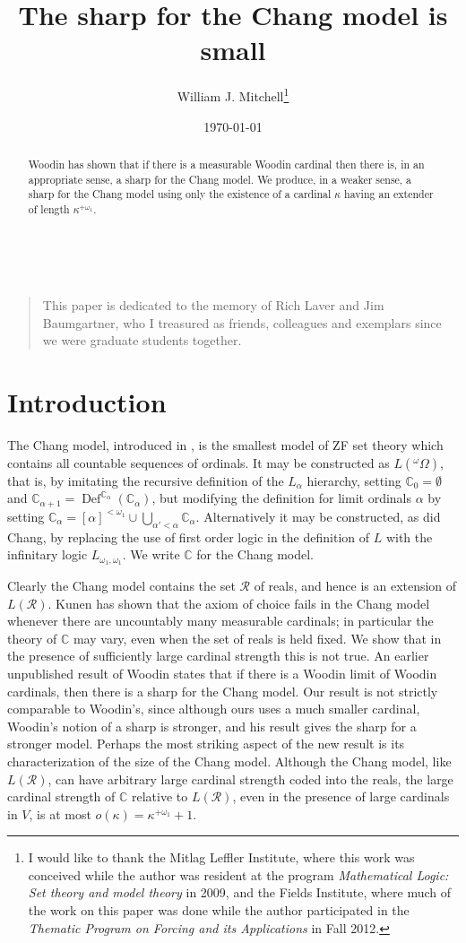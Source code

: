 \documentclass[
twoside,
]{article}
\title{The sharp for the Chang model is small}
\author{William J. Mitchell\thanks{I would like to thank the Mitlag
    Leffler Institute, where this work was conceived while the author
    was resident at the program \emph{Mathematical Logic: Set theory and model
      theory} in 2009, and the Fields Institute, where much of
    the work on this paper was done while the 
    author participated in the \emph{Thematic Program on Forcing and
      its Applications} in Fall 2012.}}
\date{\today}
\newif\iflinenumbers
\theoremstyle{definition}
\theoremstyle{remark}
\DeclareMathOperator{\DEF}{Def}
\newcommand{\ords}{\Omega}
\newcommand\reals{\mathcal{R}}
\newcommand\chang{\mathbb{C}}
\begin{document}
\maketitle\
\begin{quotation}
  This paper is dedicated to the memory of Rich Laver and
  Jim Baumgartner, who  I treasured  as friends, colleagues and
  exemplars  since we were graduate students together.
\end{quotation}
\begin{abstract}
  Woodin has shown that if there is a measurable Woodin cardinal then
  there is, in an appropriate sense, a sharp for the Chang model.  We
  produce, in a weaker sense, a sharp for the Chang model using only
  the existence of a cardinal $\kappa$ having
  an extender of length $\kappa^{+\omega_1}$.
\end{abstract}

\setcounter{tocdepth}{8}        %
\tableofcontents
\iflinenumbers
\setpagewiselinenumbers
\modulolinenumbers[3]
\linenumbers
\fi
\section{Introduction}


The Chang model, introduced in \cite{Chang1971Sets-constructi}, is the
smallest model of ZF set theory which contains all countable sequences
of ordinals.    It may be constructed  as $L({^{\omega}\ords})$,
that is, by imitating  the recursive definition of the $L_{\alpha}$
hierarchy,
setting $\chang_{0}=\emptyset$ and
$\chang_{\alpha+1}=\DEF^{\chang_{\alpha}}(\chang_{\alpha})$, but
modifying the definition for limit ordinals $\alpha$ by setting 
$\chang_{\alpha}=[\alpha]^{<\omega_1}\cup\bigcup_{\alpha'<\alpha}\chang_{\alpha}$. 
Alternatively it may be constructed, as did Chang, by replacing the
use of first order logic in the definition of $L$ with the
infinitary logic $L_{\omega_1,\omega_1}$.
We write $\chang$ for the Chang model.


Clearly the Chang model contains the set $\reals$ of reals, and hence is an
extension of $L(\reals)$.    Kunen \cite{Kunen1973A-model-for-the} has shown
that the axiom of choice fails in the
Chang model whenever there are uncountably many measurable cardinals; 
in particular the theory of $\chang$ may vary, even when the set of reals
is held fixed.    We show that in the presence of sufficiently large
cardinal strength this is not true.
An earlier unpublished result of Woodin states that if
there is a Woodin limit of  Woodin cardinals,  then there is a sharp for the
Chang model.   Our result is not strictly comparable to Woodin's,
since although ours
uses a much smaller cardinal, Woodin's notion of a sharp is
stronger, and his result gives the sharp for a stronger model.
Perhaps the most striking aspect of the new result is its
characterization of the size of the Chang model.   Although the Chang
model, like $L(\reals)$, can have arbitrary large  cardinal strength
coded into the reals,  the large cardinal strength of $\chang$
relative to $L(\reals)$, even in the presence of large cardinals in
$V$, is at most  $o(\kappa)=\kappa^{+\omega_1}+1$.
\end{document}
